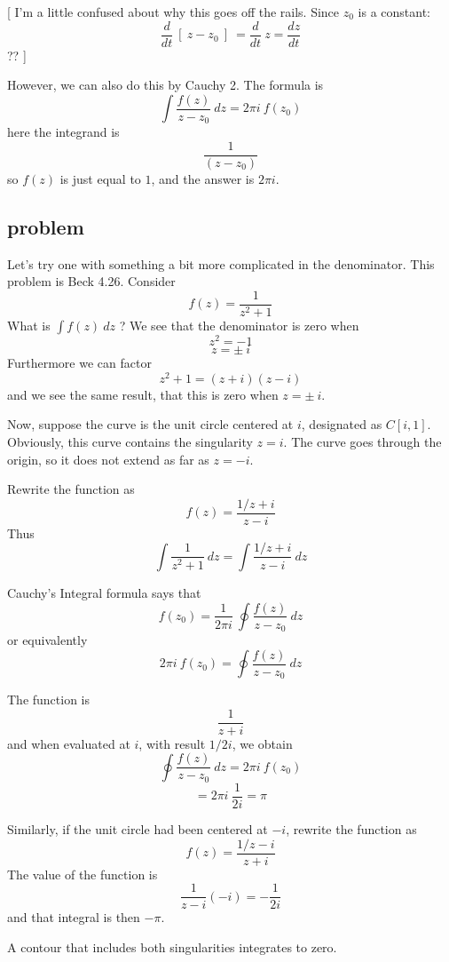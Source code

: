 \documentclass[11pt, oneside]{article}   	%
\begin{document}
[ I'm a little confused about why this goes off the rails.  Since $z_0$ is a constant:
\[ \frac{d}{dt} \ [ \  z - z_0  \ ] \ =   \frac{d}{dt} \  z = \frac{dz}{dt}  \]
?? ]

However, we can also do this by Cauchy 2. The formula is
\[ \int \frac{f(z)}{z - z_0} \ dz = 2 \pi i \ f(z_0) \]
here the integrand is
\[ \frac{1}{(z-z_0)} \]
so $f(z)$ is just equal to $1$, and the answer is $2 \pi i$.

\subsection*{problem}
Let's try one with something a bit more complicated in the denominator.  This problem is Beck 4.26.  Consider 
\[ f(z) = \frac{1}{z^2 + 1} \]
What is $\int f(z) \ dz$ ?  We see that the denominator is zero when
\[ z^2 = -1 \]
\[ z = \pm \ i \]
Furthermore we can factor
\[ z^2 + 1 = (z + i) (z-i) \]
and we see the same result, that this is zero when $z = \pm \ i $.

Now, suppose the curve is the unit circle centered at $i$, designated as $C[i,1]$.  Obviously, this curve contains the singularity $z = i$.  The curve goes through the origin, so it does not extend as far as $z = -i$.

Rewrite the function as
\[ f(z) = \frac{1/z+i}{z-i} \]
Thus
\[ \int \frac{1}{z^2 + 1} \ dz = \int \frac{1/z+i}{z-i} \ dz \]

Cauchy's Integral formula says that
\[ f(z_0) = \frac{1}{2 \pi i} \ \oint  \frac{f(z)}{z-z_0} \ dz \]
or equivalently
\[ 2 \pi i \ f(z_0) = \oint  \frac{f(z)}{z-z_0} \ dz \]

The function is
\[ \frac{1}{z+i} \]
and when evaluated at $i$, with result $1/2i$, we obtain
\[ \oint  \frac{f(z)}{z-z_0} \ dz = 2 \pi i \ f(z_0) \]
\[ = 2 \pi i \ \frac{1}{2i} = \pi \]

Similarly, if the unit circle had been centered at $-i$, rewrite the function as
\[ f(z) = \frac{1/z-i}{z+i} \]
The value of the function is
\[ \frac{1}{z-i}(-i) = -\frac{1}{2i} \]
and that integral is then $- \pi$.

A contour that includes both singularities integrates to zero.
\end{document}
